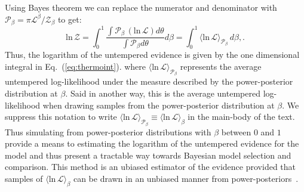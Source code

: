 Using Bayes theorem we can replace the numerator and denominator with $\mathcal{P}_\beta = \pi \mathcal{L}^\beta / \mathcal{Z}_\beta$ to get:
\begin{equation}
    \mathrm{ln} \, \mathcal{Z} = \int^1_0 \frac{\int \mathcal{P}_\beta \, \left(\mathrm{ln} \, \mathcal{L}\right) d\theta}{\int \mathcal{P}_\beta   d\theta} d\beta = \int^1_0 \langle \mathrm{ln} \, \mathcal{L} \rangle_{\mathcal{P}_\beta} \, d\beta,.
\end{equation}
Thus, the logarithm of the untempered evidence is given by the one dimensional integral in Eq.~(\ref{eq:thermoint}).
where $\langle \mathrm{ln} \, \mathcal{L} \rangle_{\mathcal{P}_\beta}$ represents the average untempered log-likelihood under the measure described by the power-posterior distribution at $\beta$. Said in another way, this is the average untempered log-likelihood when drawing samples from the power-posterior distribution at $\beta$. We suppress this notation to write $\langle \mathrm{ln} \, \mathcal{L} \rangle_{\mathcal{P}_\beta} \equiv \langle \mathrm{ln} \, \mathcal{L} \rangle_\beta$ in the main-body of the text. Thus simulating from power-posterior distributions with $\beta$ between $0$ and $1$ provide a means to estimating the logarithm of the untempered evidence for the model and thus present a tractable way towards Bayesian model selection and comparison. This method is an ubiased estimator of the evidence provided that samples of $\langle \mathrm{ln} \, \mathcal{L} \rangle_\beta$ can be drawn in an unbiased manner from power-posteriors~\citep{carlson2016partition}.

